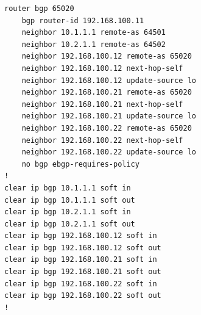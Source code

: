 \documentclass{report}
\begin{document}
\begin{lstlisting}[style=styleConf, caption=BGP configuration example, label=lst:template_bgp_conf]
router bgp 65020
    bgp router-id 192.168.100.11
    neighbor 10.1.1.1 remote-as 64501
    neighbor 10.2.1.1 remote-as 64502
    neighbor 192.168.100.12 remote-as 65020
    neighbor 192.168.100.12 next-hop-self
    neighbor 192.168.100.12 update-source lo
    neighbor 192.168.100.21 remote-as 65020
    neighbor 192.168.100.21 next-hop-self
    neighbor 192.168.100.21 update-source lo
    neighbor 192.168.100.22 remote-as 65020
    neighbor 192.168.100.22 next-hop-self
    neighbor 192.168.100.22 update-source lo
    no bgp ebgp-requires-policy
!
clear ip bgp 10.1.1.1 soft in
clear ip bgp 10.1.1.1 soft out
clear ip bgp 10.2.1.1 soft in
clear ip bgp 10.2.1.1 soft out
clear ip bgp 192.168.100.12 soft in
clear ip bgp 192.168.100.12 soft out
clear ip bgp 192.168.100.21 soft in
clear ip bgp 192.168.100.21 soft out
clear ip bgp 192.168.100.22 soft in
clear ip bgp 192.168.100.22 soft out
!
\end{lstlisting}
\end{document}
